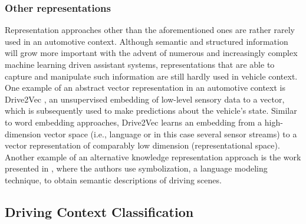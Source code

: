 \subsubsection{Other representations}
Representation approaches other than the aforementioned ones are rather rarely used in an automotive context.
Although semantic and structured information will grow more important with the advent of numerous and increasingly complex machine learning driven assistant systems, representations that are able to capture and manipulate such information are still hardly used in vehicle context.
One example of an abstract vector representation in an automotive context is Drive2Vec \cite{Hallac2018}, an unsupervised embedding of low-level sensory data to a vector, which is subsequently used to make predictions about the vehicle's state.
Similar to word embedding approaches, Drive2Vec learns an embedding from a high-dimension vector space (i.e., language or in this case several sensor streams) to a vector representation of comparably low dimension (representational space).
Another example of an alternative knowledge representation approach is the work presented in \cite{Yamazaki2016}, where the authors use symbolization, a language modeling technique, to obtain semantic descriptions of driving scenes.

\subsection{Driving Context Classification}%
\label{subsec:driving_context_classification}

